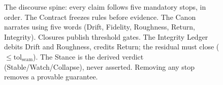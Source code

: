 \documentclass[
  aps,
  prd,
  twocolumn,
  superscriptaddress,
  nofootinbib,
  floatfix
]{revtex4-2}
\newcommand{\tolseam}{\mathrm{tol}_{\mathrm{seam}}}
\newcommand{\IC}{\mathrm{IC}}
\begin{document}
\begin{figure}[t!]
\caption{The discourse spine: every claim follows five
mandatory stops, in order.  The Contract freezes rules
before evidence.  The Canon narrates using five words
(Drift, Fidelity, Roughness, Return, Integrity).
Closures publish threshold gates.  The Integrity Ledger
debits Drift and Roughness, credits Return; the residual
must close ($\leq \tolseam$).  The Stance is the derived
verdict (Stable/Watch/Collapse), never asserted.  Removing
any stop removes a provable guarantee.}
\label{fig:spine}
\end{figure}
\end{document}
